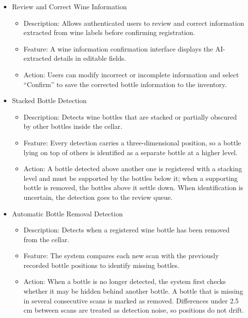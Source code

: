 \documentclass[conference]{IEEEtran}
\begin{document}
\begin{itemize}
    \item Review and Correct Wine Information
    \begin{itemize}
        \item Description: Allows authenticated users to review and correct information extracted from wine labels before confirming registration.
        \item Feature: A wine information confirmation interface displays the AI-extracted details in editable fields.
        \item Action: Users can modify incorrect or incomplete information and select ``Confirm'' to save the corrected bottle information to the inventory.
    \end{itemize}

    \item Stacked Bottle Detection
    \begin{itemize}
        \item Description: Detects wine bottles that are stacked or partially obscured by other bottles inside the cellar.
        \item Feature: Every detection carries a three-dimensional position, so a bottle lying on top of others is identified as a separate bottle at a higher level.
        \item Action: A bottle detected above another one is registered with a stacking level and must be supported by the bottles below it; when a supporting bottle is removed, the bottles above it settle down. When identification is uncertain, the detection goes to the review queue.
    \end{itemize}

    \item Automatic Bottle Removal Detection
    \begin{itemize}
        \item Description: Detects when a registered wine bottle has been removed from the cellar.
        \item Feature: The system compares each new scan with the previously recorded bottle positions to identify missing bottles.
        \item Action: When a bottle is no longer detected, the system first checks whether it may be hidden behind another bottle. A bottle that is missing in several consecutive scans is marked as removed. Differences under 2.5 cm between scans are treated as detection noise, so positions do not drift.
    \end{itemize}


\end{itemize}
\end{document}
